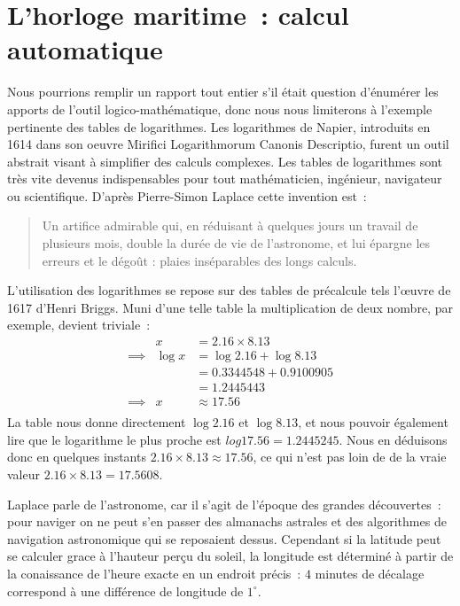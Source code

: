 \section{L'horloge maritime~: calcul automatique}
Nous pourrions remplir un rapport tout entier s'il était question d'énumérer les apports de l'outil logico-mathématique, donc nous nous limiterons à l'exemple pertinente des tables de logarithmes. Les logarithmes de Napier, introduits en 1614 dans son oeuvre \og{}Mirifici Logarithmorum Canonis Descriptio\fg{}, furent un outil abstrait visant à simplifier des calculs complexes. Les tables de logarithmes sont très vite devenus indispensables pour tout mathématicien, ingénieur, navigateur ou scientifique. D'après Pierre-Simon Laplace cette invention est\cite{history-of-astronomy}~:
\begin{quote}
Un artifice admirable qui, en réduisant à quelques jours un travail de plusieurs mois, double la durée de vie de l'astronome, et lui épargne les erreurs et le dégoût : plaies inséparables des longs calculs.
\end{quote}
L'utilisation des logarithmes se repose sur des tables de précalcule tels l'\oe{}uvre de 1617 d'Henri Briggs. Muni d'une telle table la multiplication de deux nombre, par exemple, devient triviale~:
\begin{eqnarray}
                    &x            &= 2.16\times{8.13}              \nonumber \\
        \implies{}  &\log{x}      &= \log{2.16}+\log{8.13}         \nonumber \\
                    &             &= 0.3344548 + 0.9100905         \nonumber \\
                    &             &= 1.2445443                     \nonumber \\
        \implies{}  &x            &\approx{17.56}                   \nonumber \\
\end{eqnarray}
La table nous donne directement $\log{2.16}$ et $\log{8.13}$, et nous pouvoir également lire que le logarithme le plus proche est $log{17.56} = 1.2445245$. Nous en déduisons donc en quelques instants $2.16\times{8.13} \approx{17.56}$, ce qui n'est pas loin de de la vraie valeur $2.16\times{8.13}={17.5608}$.

Laplace parle de l'astronome, car il s'agit de l'époque des grandes découvertes~: pour naviger on ne peut s'en passer des almanachs astrales et des algorithmes de navigation astronomique qui se reposaient dessus. Cependant si la latitude peut se calculer grace à l'hauteur perçu du soleil, la longitude est déterminé à partir de la conaissance de l'heure exacte en un endroit précis~: $4$ minutes de décalage correspond à une différence de longitude de $1^{\circ}$.  

